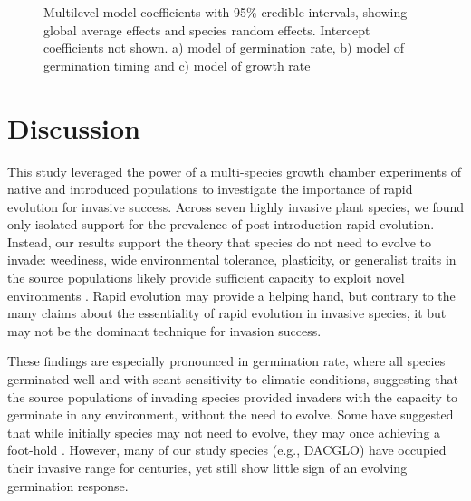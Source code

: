\documentclass[12pt]{article}\usepackage[]{graphicx}\usepackage[]{color}
\begin{document}
\begin{figure}
	\caption{Multilevel model coefficients with 95\% credible intervals, showing global average effects and species random effects. Intercept coefficients not shown.  a) model of germination rate, b) model of germination timing and c) model of growth rate}
	\label{fig:coef}
\end{figure}

	\section{Discussion} 
	
	This study leveraged the power of a multi-species growth chamber experiments of native and introduced populations to investigate the importance of rapid evolution for invasive success. Across seven highly invasive plant species, we found only isolated support for the prevalence of post-introduction rapid evolution. Instead, our results support the theory that species do not need to evolve to invade: weediness, wide environmental tolerance, plasticity, or generalist traits in the source populations likely provide sufficient capacity to exploit novel environments \parencite{Baker1965}. Rapid evolution may provide a helping hand, but contrary to the many claims about the essentiality of rapid evolution in invasive species, it but may not be the dominant technique for invasion success.  
	
	These findings are  especially pronounced in germination rate, where all species germinated well and with scant sensitivity to climatic conditions, suggesting that the source populations of invading species provided invaders with the capacity to germinate in any environment, without the need to evolve. Some have suggested that while initially species may not need to evolve, they may once achieving a foot-hold \parencite{Lamarque2015}. However, many of our study species (e.g., DACGLO) have occupied their invasive range for centuries, yet still show little sign of an evolving germination response. 
	
\end{document}

